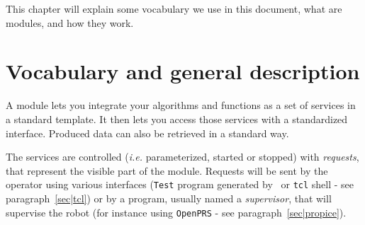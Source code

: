 %
%
%
%
%
%
%

This chapter will explain some vocabulary we use in this document, what
are modules, and how they work.


\section{Vocabulary and general description}
\label{sec|module|voc}

A module lets  you integrate your  algorithms and functions  as  a set of
services in a  standard template. It then lets  you access those services
with a standardized  interface. Produced data can  also be retrieved in a
standard way.

The services are controlled (\emph{i.e.} parameterized, started or stopped)
with  \emph{requests},  that  represent  the    visible  part   of   the
module. Requests  will be sent by the operator using various interfaces
(\texttt{Test} program  generated   by \GenoM\ or  \texttt{tcl}  shell  - see
paragraph~\vref{sec|tcl})    or  by a  program,    usually  named a  
\emph{supervisor},  that  will supervise  the  robot  (for  instance using
\texttt{OpenPRS} - see paragraph~\vref{sec|propice}).
 
